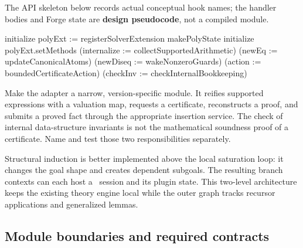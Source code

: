 The API skeleton below records actual conceptual hook names; the handler
bodies and Forge state are \textbf{design pseudocode}, not a compiled module.

\begin{Code}
initialize polyExt := registerSolverExtension makePolyState
initialize polyExt.setMethods
  (internalize := collectSupportedArithmetic)
  (newEq       := updateCanonicalAtoms)
  (newDiseq    := wakeNonzeroGuards)
  (action      := boundedCertificateAction)
  (checkInv    := checkInternalBookkeeping)
\end{Code}

Make the adapter a narrow, version-specific module. It reifies supported
expressions with a valuation map, requests a certificate, reconstructs a
proof, and submits a proved fact through the appropriate insertion service.
The check of internal data-structure invariants is not the mathematical
soundness proof of a certificate. Name and test those two responsibilities
separately.

Structural induction is better implemented above the local saturation loop:
it changes the goal shape and creates dependent subgoals. The resulting branch
contexts can each host a \grind\ session and its plugin state. This two-level
architecture keeps the existing theory engine local while the outer graph
tracks recursor applications and generalized lemmas.

\subsection{Module boundaries and required contracts}

